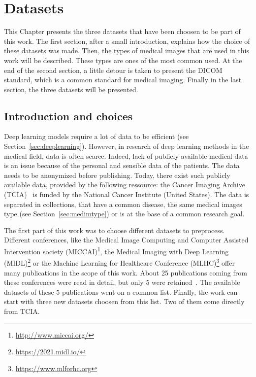 
\chapter{Datasets}
\label{ch:datasets}
This Chapter presents the three datasets that have been choosen to be part of this work. The first section, after a small introduction, explains how the choice of these datasets was made. Then, the types of medical images that are used in this work will be described. These types are ones of the most common used. At the end of the second section, a little detour is taken to present the DICOM standard, which is a common standard for medical imaging. Finally in the last section, the three datasets will be presented.


\section{Introduction and choices}
Deep learning models require a lot of data to be efficient (see Section~\ref{sec:deeplearning}). However, in research of deep learning methods in the medical field, data is often scarce. Indeed, lack of publicly available medical data is an issue because of the personal and sensible data of the patients. The data needs to be anonymized before publishing. Today, there exist such publicly available data, provided by the following ressource: the Cancer Imaging Archive (TCIA)~\cite{clark_cancer_2013} is funded by the National Cancer Institute (United States). The data is separated in collections, that have a common disease, the same medical images type (see Section~\ref{sec:medimtype}) or is at the base of a common research goal.

The first part of this work was to choose different datasets to preprocess. Different conferences, like the Medical Image Computing and Computer Assisted Intervention society (MICCAI)\footnote{\url{http://www.miccai.org/}}, the Medical Imaging with Deep Learning (MIDL)\footnote{\url{https://2021.midl.io/}} or the Machine Learning for Healthcare Conference (MLHC)\footnote{\url{https://www.mlforhc.org}} offer many publications in the scope of this work. About 25 publications coming from these conferences were read in detail, but only 5 were retained~\cite{wang_transbts_2021, xie_transferable_2017, ding_accurate_2017, andrearczyk_automatic_2020, wang_residual_2021}. The available datasets of these 5 publications went on a common list. Finally, the work can start with three new datasets choosen from this list. Two of them come directly from TCIA.


